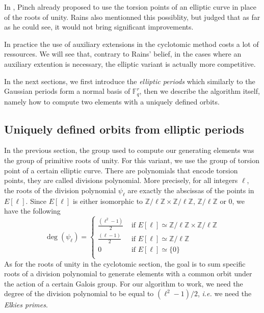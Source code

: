 \documentclass[12pt]{article}
\theoremstyle{plain}
\theoremstyle{definition}
\def\Z{\ensuremath{\mathbb{Z}}}
\def\F{\ensuremath{\mathbb{F}}}
\newcounter{algorithm}
\begin{document}
In \cite{Pinch}, Pinch already proposed to use the torsion points of an elliptic
curve in place of the roots of unity. Rains also mentionned this possiblity, 
but judged that as far as he could see, it would not bring significant 
improvements.
 
In practice the use of auxiliary extensions in the cyclotomic method costs a
lot of ressources. We will see that, contrary to Rains' belief, in the cases 
where an auxiliary extention is necessary, the elliptic variant is actually more 
competitive.

In the next sections, we first introduce the \emph{elliptic periods} which
similarly to the Gaussian periods form a normal basis of $\F_q^r$, then we 
describe the algorithm itself, namely how to compute two elements with a
uniquely defined orbits.
 
\subsection{Uniquely defined orbits from elliptic periods}

In the previous section, the group used to compute our generating elements was
the group of primitive roots of unity. For this variant, we use the group of
torsion point of a certain elliptic curve. There are polynomials that encode 
torsion points, they are called divisions polynomial. More precisely, for
all integers $\ell$, the roots of the division polynomial $\psi_\ell$ are exactly the 
abscissas of the points in $E[\ell]$. Since $E[\ell]$ is either isomorphic to 
$\Z/\ell\Z\times\Z/\ell\Z$, $\Z/\ell\Z$ or $0$, we have the following
\begin{equation}
\deg(\psi_\ell) = \begin{cases}
   \tfrac{(\ell^2-1)}{2} &\text{ if }E[\ell]\simeq\Z/\ell\Z\times\Z/\ell\Z\\
   \tfrac{(\ell-1)}{2} &\text{ if }E[\ell]\simeq\Z/\ell\Z\\
   0 &\text{ if } E[\ell]\simeq\lbrace{0}\rbrace\\
\end{cases}
\end{equation}
As for the roots of unity in the cyclotomic section, the goal is to sum
specific roots of a division polynomial to generate elements with a common orbit
under the action of a certain Galois group. For our algorithm to work, we 
need the degree of the division polynomial to be equal to $(\ell^2 - 1)/2$,
\emph{i.e.} we need the \emph{Elkies primes}.
\end{document}
